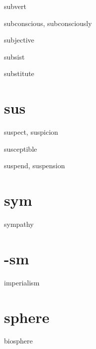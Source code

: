 \begin{RefWord}{subvert}
\end{RefWord}

\begin{RefWord}{subconscious, subconsciously}
\end{RefWord}

\begin{RefWord}{subjective}
\end{RefWord}

\begin{RefWord}{subsist}
\end{RefWord}

\begin{RefWord}{substitute}
\end{RefWord}

\section{sus}

\begin{RefWord}{suspect, suspicion}
\end{RefWord}

\begin{RefWord}{susceptible}
\end{RefWord}

\begin{RefWord}{suspend, suspension}
\end{RefWord}

\section{sym}

\begin{RefWord}{sympathy}
\end{RefWord}



\section{-sm}

\begin{RefWord}{imperialism}
\end{RefWord}

\section{sphere}
\begin{RefWord}{biosphere}
\end{RefWord}

